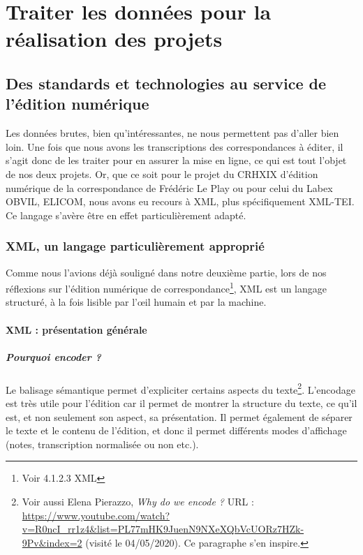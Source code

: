 \part{Traiter les données pour la réalisation des projets}

\chapter{Des standards et technologies au service de l'édition numérique}

Les données brutes, bien qu'intéressantes, ne nous permettent pas d'aller bien loin. Une fois que nous avons les transcriptions des correspondances à éditer, il s'agit donc de les traiter pour en assurer la mise en ligne, ce qui est tout l'objet de nos deux projets. Or, que ce soit pour le projet du CRHXIX d'édition numérique de la correspondance de Frédéric Le Play ou pour celui du Labex OBVIL, ELICOM, nous avons eu recours à XML, plus spécifiquement XML-TEI. Ce langage s'avère être en effet particulièrement adapté.

\section{XML, un langage particulièrement approprié}

Comme nous l'avions déjà souligné dans notre deuxième partie, lors de nos réflexions sur l'édition numérique de correspondance\footnote{Voir 4.1.2.3 XML}, XML est un langage structuré, à la fois lisible par l'\oe il humain et par la machine. 

\subsection{XML : présentation générale}
 
\subsubsection{Pourquoi encoder ?}
Le balisage sémantique permet d'expliciter certains aspects du texte\footnote{Voir aussi Elena Pierazzo, \emph{Why do we encode ?} URL : \url{https://www.youtube.com/watch?v=R0ncI_rr1z4&list=PL77mHK9JuenN9NXeXQbVcUORz7HZk-9Pv&index=2} (visité le 04/05/2020). Ce paragraphe s'en inspire.}. L'encodage est très utile pour l'édition car il permet de montrer la structure du texte, ce qu'il est, et non seulement son aspect, sa présentation. Il permet également de séparer le texte et le contenu de l'édition, et donc il permet différents modes d'affichage (notes, transcription normalisée ou non etc.).

